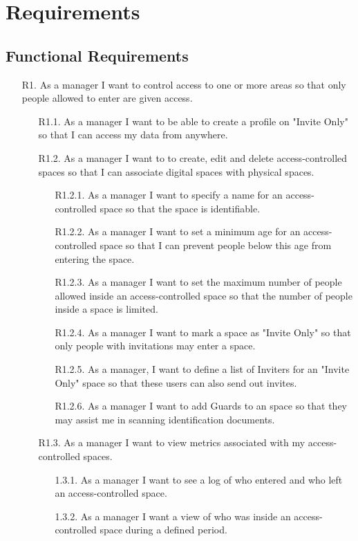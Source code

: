 \section{Requirements} \label{Requirements}

\subsection{Functional Requirements} \label{Functional Requirements}
\begin{itemize}
    \item[R1.] As a manager I want to control access to one or more areas so that only people allowed to enter are given access.
    \begin{itemize}
        \item[R1.1.] As a manager I want to be able to create a profile on "Invite Only" so that I can access my data from anywhere.
        \item[R1.2.] As a manager I want to to create, edit and delete access-controlled spaces so that I can associate digital spaces with physical spaces.
        \begin{itemize}
            \item[R1.2.1.] As a manager I want to specify a name for an access-controlled space so that the space is identifiable.
            \item[R1.2.2.] As a manager I want to set a minimum age for an access-controlled space so that I can prevent people below this age from entering the space.
            \item[R1.2.3.] As a manager I want to set the maximum number of people allowed inside an access-controlled space so that the  number of people inside a space is limited.
            \item[R1.2.4.] As a manager I want to mark a space as "Invite Only" so that only people with invitations may enter a space.
            \item[R1.2.5.] As a manager, I want to define a list of Inviters for an "Invite Only" space so that these users can also send out invites.
            \item[R1.2.6.] As a manager I want to add Guards to an space so that they may assist me in scanning identification documents.
        \end{itemize}
        \item[R1.3.] As a manager I want to view metrics associated with my access-controlled spaces.
        \begin{itemize}
            \item[1.3.1.] As a manager I want to see a log of who entered and who left an access-controlled space.
            \item[1.3.2.] As a manager I want a view of who was inside an access-controlled space during a defined period.
        \end{itemize}
    \end{itemize}
    

\end{itemize}
